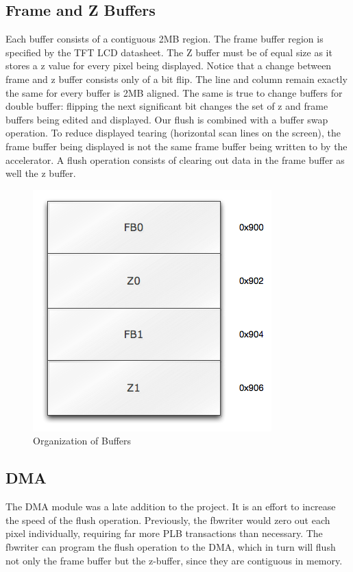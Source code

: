 \documentclass[letterpaper,10pt]{article}
\begin{document}
\subsection{Frame and Z Buffers}
Each buffer consists of a contiguous 2MB region.  The frame buffer region is specified by the TFT LCD datasheet.  The Z buffer must be of equal size as it stores a z value for every pixel being displayed.  Notice that a change between frame and z buffer consists only of a bit flip.  The line and column remain exactly the same for every buffer is 2MB aligned.  The same is true to change buffers for double buffer: flipping the next significant bit changes the set of z and frame buffers being edited and displayed.  Our flush is combined with a buffer swap operation.   To reduce displayed tearing (horizontal scan lines on the screen), the frame buffer being displayed is not the same frame buffer being written to by the accelerator.  A flush operation consists of clearing out data in the frame buffer as well the z buffer.

\begin{figure}[htb]
\begin{center}
\includegraphics[scale=.68]{buffer_space.png}
\end{center}
\caption{Organization of Buffers}
\label{fig:buffer_space}
\end{figure}

\subsection{DMA}
The DMA module was a late addition to the project.  It is an effort to increase the speed of the flush operation.  Previously, the fbwriter would zero out each pixel individually, requiring far more PLB transactions than necessary.  The fbwriter can program the flush operation to the DMA, which in turn will flush not only the frame buffer but the z-buffer, since they are contiguous in memory.
\end{document}
